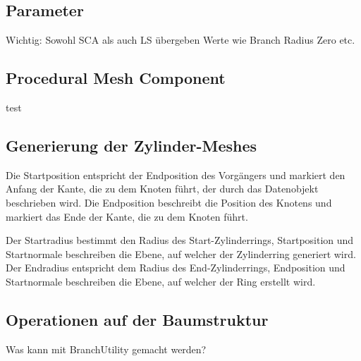 \subsection{Parameter} \label{subsec:Modellgenerierung_Parameter}

Wichtig: Sowohl SCA als auch LS übergeben Werte wie Branch Radius Zero etc.

\subsection{Procedural Mesh Component}

test

\subsection{Generierung der Zylinder-Meshes} \label{subsec:ZylinderMeshes}

Die Startposition entspricht der Endposition des Vorgängers und markiert den Anfang der Kante, die zu dem Knoten führt, der durch das Datenobjekt beschrieben wird. Die Endposition beschreibt die Position des Knotens und markiert das Ende der Kante, die zu dem Knoten führt. 

Der Startradius bestimmt den Radius des Start-Zylinderrings, Startposition und Startnormale beschreiben die Ebene, auf welcher der Zylinderring generiert wird. Der Endradius entspricht dem Radius des End-Zylinderrings, Endposition und Startnormale beschreiben die Ebene, auf welcher der Ring erstellt wird.

\subsection{Operationen auf der Baumstruktur}

Was kann mit BranchUtility gemacht werden?
